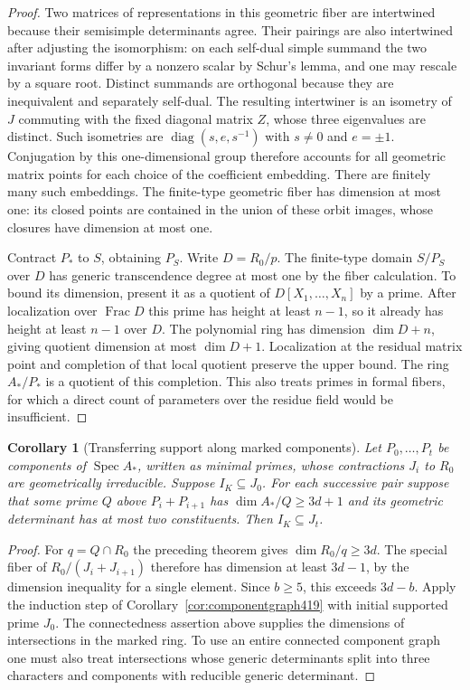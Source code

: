 \documentclass[a4paper,11pt]{article}
\newtheorem{corollary}[proposition]{Corollary}
\theoremstyle{definition}
\theoremstyle{remark}
\numberwithin{equation}{section}
\begin{document}
\begin{proof}
Two matrices of representations in this geometric fiber are
intertwined because their semisimple determinants agree. Their
pairings are also intertwined after adjusting the isomorphism:
on each self-dual simple summand the two invariant forms differ
by a nonzero scalar by Schur's lemma, and one may rescale by a
square root. Distinct summands are orthogonal because they are
inequivalent and separately self-dual. The resulting intertwiner
is an isometry of \(J\) commuting with the fixed diagonal matrix
\(Z\), whose three eigenvalues are distinct. Such isometries
are \(\operatorname{diag}(s,e,s^{-1})\) with \(s\ne0\) and
\(e=\pm1\). Conjugation by this one-dimensional group therefore
accounts for all geometric matrix points for each choice of
the coefficient embedding. There are finitely many such
embeddings. The finite-type geometric fiber has dimension at
most one: its closed points are contained in the union of these
orbit images, whose closures have dimension at most one.

Contract \(P_*\) to \(S\), obtaining \(P_S\). Write
\(D=R_0/p\). The finite-type domain \(S/P_S\) over \(D\)
has generic transcendence degree at most one by the fiber
calculation. To bound its dimension, present it as a quotient
of \(D[X_1,\ldots,X_n]\) by a prime. After localization over
\(\operatorname{Frac}D\) this prime has height at least \(n-1\),
so it already has height at least \(n-1\) over \(D\). The polynomial
ring has dimension \(\dim D+n\), giving quotient dimension at
most \(\dim D+1\). Localization at the residual matrix point
and completion of that local quotient preserve the upper bound.
The ring \(A_*/P_*\) is a quotient of this completion. This
also treats primes in formal fibers, for which a direct count
of parameters over the residue field would be insufficient.
\end{proof}

\begin{corollary}[Transferring support along marked components]\leavevmode
\label{cor:markedtransfer420}
Let \(P_0,\ldots,P_t\) be components of \(\operatorname{Spec}A_*\),
written as minimal primes, whose contractions \(J_i\) to \(R_0\)
are geometrically irreducible. Suppose \(I_K\subseteq J_0\).
For each successive pair suppose that some prime \(Q\) above
\(P_i+P_{i+1}\) has \(\dim A_*/Q\ge3d+1\) and its geometric
determinant has at most two constituents. Then \(I_K\subseteq J_t\).
\end{corollary}
\begin{proof}
For \(q=Q\cap R_0\) the preceding theorem gives
\(\dim R_0/q\ge3d\). The special fiber of \(R_0/(J_i+J_{i+1})\)
therefore has dimension at least \(3d-1\), by the dimension
inequality for a single element. Since \(b\ge5\), this exceeds
\(3d-b\). Apply the induction step of
Corollary~\ref{cor:componentgraph419} with initial supported
prime \(J_0\). The connectedness assertion above supplies the
dimensions of intersections in the marked ring. To use an entire
connected component graph one must also treat intersections
whose generic determinants split into three characters and
components with reducible generic determinant.
\end{proof}
\end{document}
